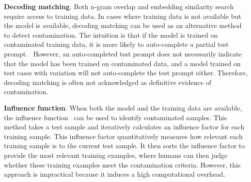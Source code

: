 \textbf{Decoding matching}. Both n-gram overlap and embedding similarity search require access to training data. 
In cases where training data is not available but the model is available, decoding matching can be used as an alternative method to detect contamination.
The intuition is that if the model is trained on contaminated training data, it is more likely to auto-complete a partial test prompt.~\citep{li2023estimating}
However, an auto-completed test prompt does not necessarily indicate that the model has been trained on contaminated data, and a model trained on test cases with variation will not auto-complete the test prompt either.
Therefore, decoding matching is often not acknowledged as definitive evidence of contamination. 

\textbf{Influence function}. When both the model and the training data are available, the influence function~\citep{koh2020understanding} can be used to identify contaminated samples.
This method takes a test sample and iteratively calculates an influence factor for each training sample. This influence factor quantitatively measures how relevant each training sample is to the current test sample. It then sorts the influence factor to provide the most relevant training examples, where humans can then judge whether these training examples meet the contamination criteria.
However, this approach is impractical because it induces a high computational overhead.




